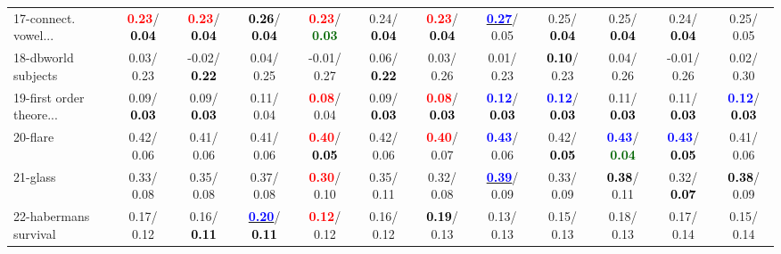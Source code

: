 \begin{table}[h]
\begin{center}
{\begin{tabular}{lc|c|c|c|c|c|c|c|c|c|c}
17-connect. vowel... & \textcolor{red}{\textbf{  0.23}}/\textcolor{black}{\textbf{  0.04}} & \textcolor{red}{\textbf{  0.23}}/\textcolor{black}{\textbf{  0.04}} & \textcolor{black}{\textbf{  0.26}}/\textcolor{black}{\textbf{  0.04}} & \textcolor{red}{\textbf{  0.23}}/\textcolor{darkgreen}{\textbf{  0.03}} &   0.24/\textcolor{black}{\textbf{  0.04}} & \textcolor{red}{\textbf{  0.23}}/\textcolor{black}{\textbf{  0.04}} & \underline{\textcolor{blue}{\textbf{  0.27}}}/  0.05 &   0.25/\textcolor{black}{\textbf{  0.04}} &   0.25/\textcolor{black}{\textbf{  0.04}} &   0.24/\textcolor{black}{\textbf{  0.04}} &   0.25/  0.05 \\
18-dbworld subjects &   0.03/  0.23 &  -0.02/\textcolor{black}{\textbf{  0.22}} &   0.04/  0.25 &  -0.01/  0.27 &   0.06/\textcolor{black}{\textbf{  0.22}} &   0.03/  0.26 &   0.01/  0.23 & \textcolor{black}{\textbf{  0.10}}/  0.23 &   0.04/  0.26 &  -0.01/  0.26 &   0.02/  0.30 \\
19-first order theore... &   0.09/\textcolor{black}{\textbf{  0.03}} &   0.09/\textcolor{black}{\textbf{  0.03}} &   0.11/  0.04 & \textcolor{red}{\textbf{  0.08}}/  0.04 &   0.09/\textcolor{black}{\textbf{  0.03}} & \textcolor{red}{\textbf{  0.08}}/\textcolor{black}{\textbf{  0.03}} & \textcolor{blue}{\textbf{  0.12}}/\textcolor{black}{\textbf{  0.03}} & \textcolor{blue}{\textbf{  0.12}}/\textcolor{black}{\textbf{  0.03}} &   0.11/\textcolor{black}{\textbf{  0.03}} &   0.11/\textcolor{black}{\textbf{  0.03}} & \textcolor{blue}{\textbf{  0.12}}/\textcolor{black}{\textbf{  0.03}} \\
20-flare &   0.42/  0.06 &   0.41/  0.06 &   0.41/  0.06 & \textcolor{red}{\textbf{  0.40}}/\textcolor{black}{\textbf{  0.05}} &   0.42/  0.06 & \textcolor{red}{\textbf{  0.40}}/  0.07 & \textcolor{blue}{\textbf{  0.43}}/  0.06 &   0.42/\textcolor{black}{\textbf{  0.05}} & \textcolor{blue}{\textbf{  0.43}}/\textcolor{darkgreen}{\textbf{  0.04}} & \textcolor{blue}{\textbf{  0.43}}/\textcolor{black}{\textbf{  0.05}} &   0.41/  0.06 \\
21-glass &   0.33/  0.08 &   0.35/  0.08 &   0.37/  0.08 & \textcolor{red}{\textbf{  0.30}}/  0.10 &   0.35/  0.11 &   0.32/  0.08 & \underline{\textcolor{blue}{\textbf{  0.39}}}/  0.09 &   0.33/  0.09 & \textcolor{black}{\textbf{  0.38}}/  0.11 &   0.32/\textcolor{black}{\textbf{  0.07}} & \textcolor{black}{\textbf{  0.38}}/  0.09 \\ \hline
22-habermans survival &   0.17/  0.12 &   0.16/\textcolor{black}{\textbf{  0.11}} & \underline{\textcolor{blue}{\textbf{  0.20}}}/\textcolor{black}{\textbf{  0.11}} & \textcolor{red}{\textbf{  0.12}}/  0.12 &   0.16/  0.12 & \textcolor{black}{\textbf{  0.19}}/  0.13 &   0.13/  0.13 &   0.15/  0.13 &   0.18/  0.13 &   0.17/  0.14 &   0.15/  0.14 \\

\end{tabular}}
\end{center}
\end{table}
